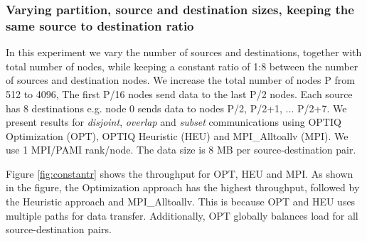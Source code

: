 \subsubsection{Varying partition, source and destination sizes, keeping the same source to destination ratio}

In this experiment we vary the number of sources and destinations, together with total number of nodes, while keeping a constant ratio of 1:8 between the number of sources and destination nodes. We increase the total number of nodes P from 512 to 4096, The first P/16 nodes send data to the last P/2 nodes. Each source has 8 destinations e.g. node 0 sends data to nodes P/2, P/2+1, ... P/2+7. We present results for {\em disjoint}, {\em overlap} and {\em subset} communications using OPTIQ Optimization (OPT), OPTIQ Heuristic (HEU) and MPI\_Alltoallv (MPI). We use 1 MPI/PAMI rank/node. The data size is 8 MB per source-destination pair. 

Figure \ref{fig:constantr} shows the throughput for OPT, HEU and MPI. As shown in the figure, the Optimization approach has the highest throughput, followed by the Heuristic approach and MPI\_Alltoallv. This is because OPT and HEU uses multiple paths for data transfer. Additionally, OPT globally balances load for all source-destination pairs. 

